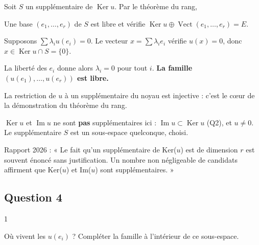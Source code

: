 \documentclass[11pt,a4paper]{article}
\newcommand{\equationajustee}[1]{%
  \sbox{\boiteequation}{$\displaystyle #1$}%
  \ifdim\wd\boiteequation>\linewidth
    \[\resizebox{\linewidth}{!}{\usebox{\boiteequation}}\]%
  \else
    \[#1\]%
  \fi}
\begin{document}
Soit \(S\) un supplémentaire de \(\operatorname{Ker}u\). Par le théorème du rang,

\equationajustee{\begin{aligned}
\dim S&=n-\dim\operatorname{Ker}u\\
&=n-(n-r)=r.
\end{aligned}}

Une base \((e_1,\dots,e_r)\) de \(S\) est libre et vérifie \(\operatorname{Ker}u\oplus\operatorname{Vect}(e_1,\allowbreak \dots,\allowbreak e_r)=E\).

Supposons \(\sum\lambda_iu(e_i)=0\). Le vecteur \(x=\sum\lambda_ie_i\) vérifie \(u(x)=0\), donc \(x\in\operatorname{Ker}u\cap S=\{0\}\).

La liberté des \(e_i\) donne alors \(\lambda_i=0\) pour tout \(i\). \textbf{La famille \((u(e_1),\dots,u(e_r))\) est libre.}

\begin{methode}

La restriction de \(u\) à un supplémentaire du noyau est injective : c'est le cœur de la démonstration du théorème du rang.

\end{methode}

\begin{piege}

\(\operatorname{Ker}u\) et \(\operatorname{Im}u\) ne sont \textbf{pas} supplémentaires ici : \(\operatorname{Im}u\subset\operatorname{Ker}u\) (Q2), et \(u\neq0\). Le supplémentaire \(S\) est un sous-espace quelconque, choisi.

\end{piege}

\begin{jury}

Rapport 2026 : « Le fait qu'un supplémentaire de Ker(\(u\)) est de dimension \(r\) est souvent énoncé sans justification. Un nombre non négligeable de candidats affirment que Ker(\(u\)) et Im(\(u\)) sont supplémentaires. »

\end{jury}

\hypertarget{question-4}{%
\subsection{Question 4}\label{question-4}}

\begin{indication}{1}

Où vivent les \(u(e_i)\) ? Compléter la famille à l'intérieur de ce sous-espace.

\end{indication}
\end{document}

